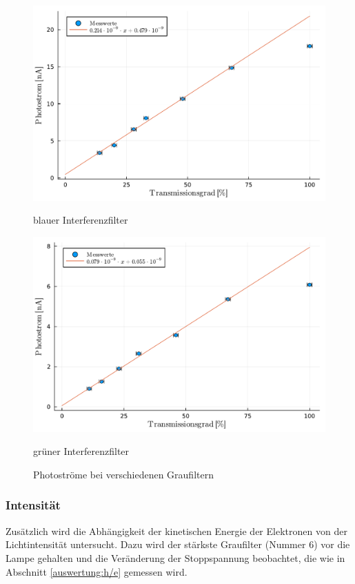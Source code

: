 \documentclass[12pt,a4paper]{scrartcl}
\numberwithin{equation}{section} %
\begin{document}
\begin{figure}[h!]
	\begin{minipage}{0.5\textwidth}
		\includegraphics[width=\textwidth]{../media/B1.4/Photostrom_blau.pdf}
		\caption*{blauer Interferenzfilter}
		\label{abb:Photostrom blau}
	\end{minipage}
	\begin{minipage}{0.5\textwidth}
		\includegraphics[width=\textwidth]{../media/B1.4/Photostrom_gruen.pdf}
		\caption*{grüner Interferenzfilter}
		\label{abb:Photostrom grün}
	\end{minipage}
	\caption{Photoströme bei verschiedenen Graufiltern}
	\label{abb:Photostrom fit}
\end{figure}


\subsubsection{Intensität}
Zusätzlich wird die Abhängigkeit der kinetischen Energie der Elektronen von der Lichtintensität untersucht. Dazu wird der stärkste Graufilter (Nummer $6$) vor die Lampe gehalten und die Veränderung der Stoppspannung beobachtet, die wie in Abschnitt \ref{auswertung:h/e} gemessen wird.
\end{document}
